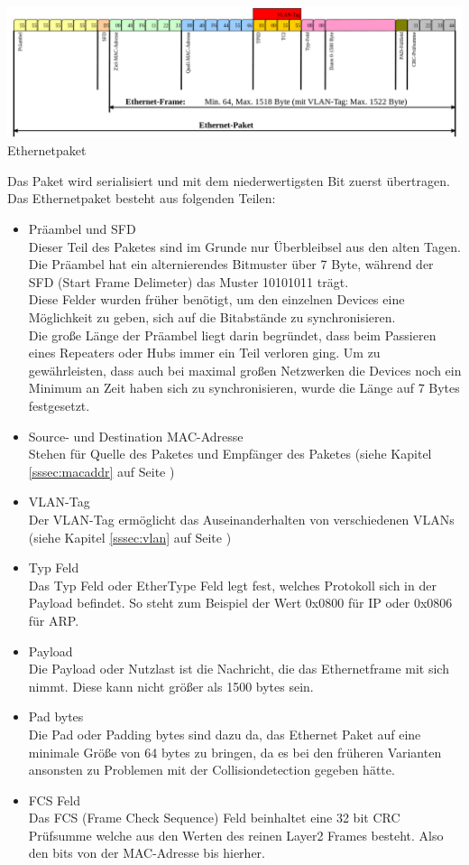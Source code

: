 \documentclass[12pt,a4paper]{report}
\begin{document}
\begin{onehalfspace}
\begin{center}
\includegraphics[scale=0.35]{../docs/tarkes/pics/Ethernetpaket.png}
Ethernetpaket
\end{center}

Das Paket wird serialisiert und mit dem niederwertigsten Bit zuerst übertragen. Das Ethernetpaket besteht aus folgenden Teilen:
\begin{itemize}
\item Präambel und SFD\\
Dieser Teil des Paketes sind im Grunde nur Überbleibsel aus den alten Tagen. Die Präambel hat ein alternierendes Bitmuster über 7 Byte, während der SFD (Start Frame Delimeter) das Muster 10101011 trägt.\\
Diese Felder wurden früher benötigt, um den einzelnen Devices eine Möglichkeit zu geben, sich auf die Bitabstände zu synchronisieren.\\
Die große Länge der Präambel liegt darin begründet, dass beim Passieren eines Repeaters oder Hubs immer ein Teil verloren ging. Um zu gewährleisten, dass auch bei maximal großen Netzwerken die Devices noch ein Minimum an Zeit haben sich zu synchronisieren, wurde die Länge auf 7 Bytes festgesetzt. 
\item Source- und Destination MAC-Adresse\\
Stehen für Quelle des Paketes und Empfänger des Paketes (siehe Kapitel \ref{sssec:macaddr} auf Seite \pageref{sssec:macaddr})
\item VLAN-Tag\\
Der VLAN-Tag ermöglicht das Auseinanderhalten von verschiedenen VLANs (siehe Kapitel \ref{sssec:vlan} auf Seite \pageref{sssec:vlan})
\item Typ Feld\\
Das Typ Feld oder EtherType Feld legt fest, welches Protokoll sich in der Payload befindet. So steht zum Beispiel der Wert 0x0800 für IP oder 0x0806 für ARP.
\item Payload\\
Die Payload oder Nutzlast ist die Nachricht, die das Ethernetframe mit sich nimmt. Diese kann nicht größer als 1500 bytes sein.
\item Pad bytes\\
Die Pad oder Padding bytes sind dazu da, das Ethernet Paket auf eine minimale Größe von 64 bytes zu bringen, da es bei den früheren Varianten ansonsten zu Problemen mit der Collisiondetection gegeben hätte.
\item FCS Feld\\
Das FCS (Frame Check Sequence) Feld beinhaltet eine 32 bit CRC Prüfsumme welche aus den Werten des reinen Layer2 Frames besteht. Also den bits von der MAC-Adresse bis hierher.
\end{itemize}


\end{onehalfspace}
\end{document}
